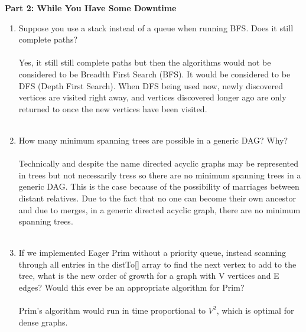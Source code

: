 \documentclass{article}
\begin{document}
\begin{center}
\textbf{Part 2: While You Have Some Downtime}
\end{center}
\begin{enumerate}
\item Suppose you use a stack instead of a queue when running BFS. Does it still complete paths?
\\
\\
Yes, it still still complete paths but then the algorithms would not be considered to be Breadth First Search (BFS). It would be considered to be DFS (Depth First Search). When DFS being used now, newly discovered vertices are visited right away, and vertices discovered longer ago are only returned to once the new vertices have been visited. 
\\
\\
\item How many minimum spanning trees are possible in a generic DAG? Why?
\\
\\
Technically and despite the name directed acyclic graphs may be represented in trees but not necessarily tress so there are no minimum spanning trees in a generic DAG. This is the case because of the possibility of marriages between distant relatives. Due to the fact that no one can become their own ancestor and due to merges, in a generic directed acyclic graph, there are no minimum spanning trees.
\\
\\
\item If we implemented Eager Prim without a priority queue, instead scanning through all entries in the distTo[] array to find the next vertex to add to the tree, what is the new order of growth for a graph with V vertices and E edges? Would this ever be an appropriate algorithm for Prim?
\\
\\
Prim's algorithm would run in time proportional to $V^2$, which is optimal for dense graphs.

\end{enumerate}
\end{document}
